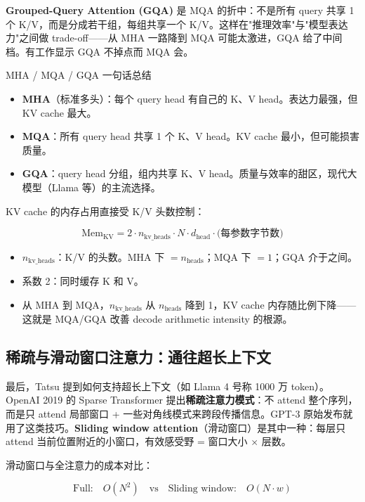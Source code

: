 \documentclass[a4paper]{article}
\begin{document}
\textbf{Grouped-Query Attention (GQA)} 是 MQA 的折中：不是所有 query 共享 1 个 K/V，而是分成若干组，每组共享一个 K/V。这样在"推理效率"与"模型表达力"之间做 trade-off——从 MHA 一路降到 MQA 可能太激进，GQA 给了中间档。有工作显示 GQA 不掉点而 MQA 会。

\begin{importantbox}{MHA / MQA / GQA 一句话总结}
\begin{itemize}
    \item \textbf{MHA}（标准多头）：每个 query head 有自己的 K、V head。表达力最强，但 KV cache 最大。
    \item \textbf{MQA}：所有 query head 共享 1 个 K、V head。KV cache 最小，但可能损害质量。
    \item \textbf{GQA}：query head 分组，组内共享 K、V head。质量与效率的甜区，现代大模型（Llama 等）的主流选择。
\end{itemize}
\end{importantbox}

KV cache 的内存占用直接受 K/V 头数控制：

\[
\text{Mem}_{\text{KV}} = 2 \cdot n_{\text{kv\_heads}} \cdot N \cdot d_{\text{head}} \cdot \text{(每参数字节数)}
\]

\begin{itemize}
    \item $n_{\text{kv\_heads}}$：K/V 的头数。MHA 下 $= n_{\text{heads}}$；MQA 下 $= 1$；GQA 介于之间。
    \item 系数 2：同时缓存 K 和 V。
    \item 从 MHA 到 MQA，$n_{\text{kv\_heads}}$ 从 $n_{\text{heads}}$ 降到 1，KV cache 内存随比例下降——这就是 MQA/GQA 改善 decode arithmetic intensity 的根源。
\end{itemize}

\subsection{稀疏与滑动窗口注意力：通往超长上下文}

最后，Tatsu 提到如何支持超长上下文（如 Llama 4 号称 1000 万 token）。OpenAI 2019 的 Sparse Transformer 提出\textbf{稀疏注意力模式}：不 attend 整个序列，而是只 attend 局部窗口 + 一些对角线模式来跨段传播信息。GPT-3 原始发布就用了这类技巧。\textbf{Sliding window attention}（滑动窗口）是其中一种：每层只 attend 当前位置附近的小窗口，有效感受野 = 窗口大小 $\times$ 层数。

滑动窗口与全注意力的成本对比：

\[
\text{Full:} \quad O(N^2) \quad\text{vs}\quad \text{Sliding window:} \quad O(N \cdot w)
\]
\end{document}

